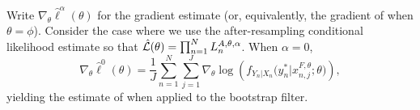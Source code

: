 \begin{lem}
\label{lem:mop-0-formula}
Write $\nabla_\theta \hat\ell^\alpha(\theta)$ for the  gradient estimate (or, equivalently, the gradient of  when $\theta=\phi$).
Consider the case where we use the after-resampling conditional likelihood estimate so that $\hat{\mathcal{L}}(\theta) = \prod_{n=1}^N L_n^{A, \theta, \alpha}$.
When $\alpha=0$,
    \begin{equation}
        \nabla_\theta \hat\ell^0(\theta) 
        = \frac{1}{J} \sum_{n=1}^N \sum_{j=1}^J \nabla_\theta \log\left(f_{Y_n|X_{n}}\big(y_n^*|x_{n,j}^{F, \theta}; \theta\big)\right),
    \end{equation}
    yielding the estimate of \cite{naesseth18} when applied to the bootstrap filter. 
\end{lem}
